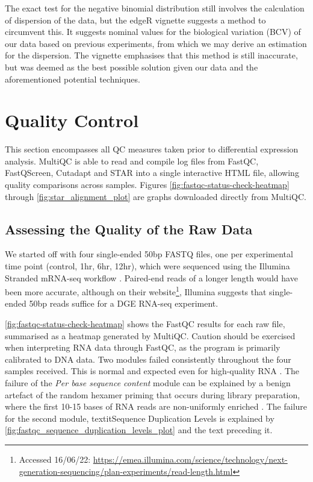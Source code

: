 The exact test for the negative binomial distribution still involves the calculation of dispersion of the data, but the edgeR vignette suggests a method to circumvent this. It suggests nominal values for the biological variation (\ac{BCV}) of our data based on previous experiments, from which we may derive an estimation for the dispersion. The vignette emphasises that this method is still inaccurate, but was deemed as the best possible solution given our data and the aforementioned potential techniques. 



\section{Quality Control}
This section encompasses all QC measures taken prior to differential expression analysis. MultiQC is able to read and compile log files from FastQC, FastQScreen, Cutadapt and STAR into a single interactive HTML file, allowing quality comparisons across samples. Figures \ref{fig:fastqc-status-check-heatmap} through \ref{fig:star_alignment_plot} are graphs downloaded directly from MultiQC.


\subsection{Assessing the Quality of the Raw Data}
\label{Assessing the Quality of the Raw Data}
We started off with four single-ended 50bp FASTQ files, one per experimental time point (control, 1hr, 6hr, 12hr), which were sequenced using the Illumina Stranded mRNA-seq workflow \citep{HiSeq2000}. Paired-end reads of a longer length would have been more accurate, although on their website\footnote{Accessed 16/06/22: \url{https://emea.illumina.com/science/technology/next-generation-sequencing/plan-experiments/read-length.html}}, Illumina suggests that single-ended 50bp reads suffice for a \ac{DGE} RNA-seq experiment.

\autoref{fig:fastqc-status-check-heatmap} shows the FastQC results for each raw file, summarised as a heatmap generated by MultiQC. Caution should be exercised when interpreting RNA data through FastQC, as the program is primarily calibrated to DNA data. Two modules failed consistently throughout the four samples received. This is normal and expected even for high-quality RNA \citep{hansen2010biases}. The failure of the \textit{Per base sequence content} module can be explained by a benign artefact of the random hexamer priming that occurs during library preparation, where the first 10-15 bases of RNA reads are non-uniformly enriched \citep{hansen2010biases}. The failure for the second module, textit{Sequence Duplication Levels} is explained by \autoref{fig:fastqc_sequence_duplication_levels_plot} and the text preceding it.

